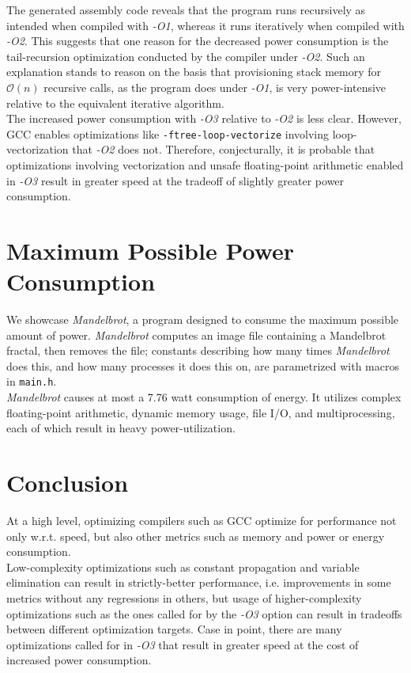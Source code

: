 \documentclass[12pt, twocolumn]{article}
\begin{document}
The generated assembly code reveals that the program runs recursively as intended when compiled with \textit{-O1}, whereas it runs iteratively when compiled with \textit{-O2}. This suggests that one reason for the decreased power consumption is the tail-recursion optimization conducted by the compiler under \textit{-O2}. Such an explanation stands to reason on the basis that provisioning stack memory for $\mathcal{O}(n)$ recursive calls, as the program does under \textit{-O1}, is very power-intensive relative to the equivalent iterative algorithm. \\
\newline
The increased power consumption with \textit{-O3} relative to \textit{-O2} is less clear. However, GCC enables optimizations like \verb|-ftree-loop-vectorize| involving loop-vectorization that \textit{-O2} does not. Therefore, conjecturally, it is probable that optimizations involving vectorization and unsafe floating-point arithmetic enabled in \textit{-O3} result in greater speed at the tradeoff of slightly greater power consumption.

\section{Maximum Possible Power Consumption}

We showcase \textit{Mandelbrot}, a program designed to consume the maximum possible amount of power. \textit{Mandelbrot} computes an image file containing a Mandelbrot fractal, then removes the file; constants describing how many times \textit{Mandelbrot} does this, and how many processes it does this on, are parametrized with macros in \verb|main.h|. \\
\newline
\textit{Mandelbrot} causes at most a 7.76 watt consumption of energy. It utilizes complex floating-point arithmetic, dynamic memory usage, file I/O, and multiprocessing, each of which result in heavy power-utilization.

\section{Conclusion}
At a high level, optimizing compilers such as GCC optimize for performance not only w.r.t. speed, but also other metrics such as memory and power or energy consumption. \\
\newline
Low-complexity optimizations such as constant propagation and variable elimination can result in strictly-better performance, i.e. improvements in some metrics without any regressions in others, but usage of higher-complexity optimizations such as the ones called for by the \textit{-O3} option can result in tradeoffs between different optimization targets. Case in point, there are many optimizations called for in \textit{-O3} that result in greater speed at the cost of increased power consumption.
\end{document}
